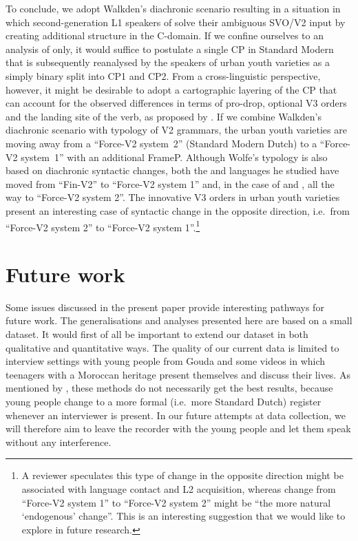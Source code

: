 \documentclass[output=paper]{langsci/langscibook}
\begin{document}
To conclude, we adopt Walkden's diachronic scenario resulting in a situation in
which second-generation L1 speakers of  solve their ambiguous SVO/V2 input
by creating additional structure in the C-domain. If we confine ourselves to an
analysis of  only, it would suffice to postulate a single CP in Standard
Modern  that is subsequently reanalysed by the speakers of urban youth
varieties as a simply binary split into CP1 and CP2. From a cross-linguistic
perspective, however, it might be desirable to adopt a cartographic layering of
the CP that can account for the observed differences in terms of pro-drop,
optional V3 orders and the landing site of the verb, as proposed by
\citet{Wolfe:2017}. If we combine Walkden's diachronic scenario with
 typology of V2 grammars, the  urban youth varieties are moving away
from a \enquote{Force-V2 system~2} (Standard Modern Dutch) to a \enquote{Force-V2 system~1}
with an additional FrameP. Although Wolfe's typology is also based on
diachronic syntactic changes,  both the  and  languages he
studied have moved from \enquote{Fin-V2} to \enquote{Force-V2 system 1} and, in
the case of  and , all the way to \enquote{Force-V2 system 2}. The
innovative V3 orders in urban youth varieties present an interesting case of
syntactic change in the opposite direction, i.e.\ from \enquote{Force-V2 system
    2} to \enquote{Force-V2 system 1}.\footnote{A reviewer speculates this type of
    change in the opposite direction might be associated with language contact
    and L2 acquisition, whereas change from \enquote{Force-V2 system 1} to
\enquote{Force-V2 system 2} might be ``the more natural `endogenous' change''.
This is an interesting suggestion that we would like to explore in future
research.}

\section{Future work}
\label{sec:fut}

\noindent Some issues discussed in the present paper provide interesting
pathways for future work. The generalisations and analyses presented here are
based on a small dataset. It would first of all be important to extend our
dataset in both qualitative and quantitative ways. The quality of our current
data is limited to interview settings with young people from Gouda and some
videos in which  teenagers with a Moroccan heritage present themselves and
discuss their lives. As mentioned by \citet{Freywaldetal:2015}, these methods
do not necessarily get the best results, because young people change to a more
formal (i.e.\ more Standard Dutch) register whenever an interviewer is present.
In our future attempts at data collection, we will therefore aim to leave the
recorder with the young people and let them speak without any interference.
\end{document}
